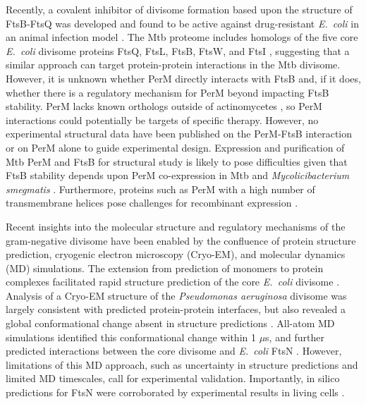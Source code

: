 \documentclass[pdflatex,sn-basic]{sn-jnl}%
\newcommand\ec{\textit{E.~coli}}
\newcommand\mtb{Mtb}
\newcommand\msmegfull{\textit{Mycolicibacterium smegmatis}}
\newcommand\pafull{\textit{Pseudomonas aeruginosa}}
\begin{document}
Recently, a covalent inhibitor of divisome formation based upon the structure of FtsB-FtsQ was developed and found to be active against drug-resistant \ec{} in an animal infection model \citep{paulussenCovalentProteomimeticInhibitor2022}. The \mtb{} proteome includes homologs of the five core \ec{} divisome proteins FtsQ, FtsL, FtsB, FtsW, and FtsI \citep{wuCharacterizationConservedNovel2018}, suggesting that a similar approach can target protein-protein interactions in the \mtb{} divisome. However, it is unknown whether PerM directly interacts with FtsB  \citep{wangPersistentMycobacteriumTuberculosis2019} and, if it does, whether there is a regulatory mechanism for PerM beyond impacting FtsB stability. PerM lacks known orthologs outside of actinomycetes \citep{goodsmithDisruptionTuberculosisMembrane2015}, so PerM interactions could potentially be targets of specific therapy. However, no experimental structural data have been published on the PerM-FtsB interaction or on PerM alone to guide experimental design. Expression and purification of \mtb{} PerM and FtsB for structural study is likely to pose difficulties given that FtsB stability depends upon PerM co-expression in \mtb{} and \msmegfull{} \citep{wangPersistentMycobacteriumTuberculosis2019}. Furthermore, proteins such as PerM with a high number of transmembrane helices pose challenges for recombinant expression \citep{graveHighthroughputStrategyIdentification2022, korepanovaCloningExpressionMultiple2005}.

Recent insights into the molecular structure and regulatory mechanisms of the gram-negative divisome have been enabled by the confluence of protein structure prediction, cryogenic electron microscopy (Cryo-EM), and molecular dynamics (MD) simulations. The extension from prediction of monomers to protein complexes \citep{baekAccuratePredictionProtein2021, evansProteinComplexPrediction2022} facilitated rapid structure prediction of the core \ec{} divisome \citep{attaibiUpdatedModelDivisome2022, cravenModelInteractionsFtsQLB2022}. Analysis of a Cryo-EM structure of the \pafull{} divisome was largely consistent with predicted protein-protein interfaces, but also revealed a global conformational change absent in structure predictions \citep{kashammerCryoEMStructureBacterial2023}. All-atom MD simulations identified this conformational change within 1 $\mu$s, and further predicted interactions between the core divisome and \ec{} FtsN \citep{brittonConformationalChangesEssential2023}. However, limitations of this MD approach, such as uncertainty in structure predictions and limited MD timescales, call for experimental validation. Importantly, in silico predictions for FtsN were corroborated by experimental results in living cells \citep{parkEssentialDomainFtsN2023}.
\end{document}
